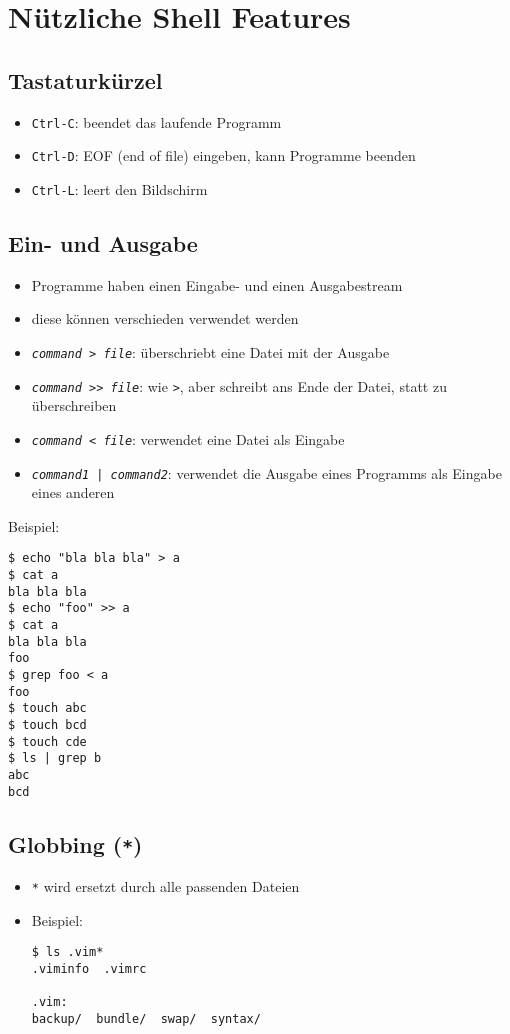 \section{Nützliche Shell Features}
\subsection{Tastaturkürzel}
\begin{itemize}
  \item \texttt{Ctrl-C}: beendet das laufende Programm
  \item \texttt{Ctrl-D}: EOF (end of file) eingeben, kann Programme beenden
  \item \texttt{Ctrl-L}: leert den Bildschirm
\end{itemize}

\subsection{Ein- und Ausgabe}
\begin{itemize}
  \item Programme haben einen Eingabe- und einen Ausgabestream
  \item diese können verschieden verwendet werden
  \item \texttt{\textit{command} > \textit{file}}: überschriebt eine Datei mit der Ausgabe
  \item \texttt{\textit{command} >> \textit{file}}: wie \texttt{>}, aber schreibt ans Ende der Datei, statt zu überschreiben
  \item \texttt{\textit{command} < \textit{file}}: verwendet eine Datei als Eingabe
  \item \texttt{\textit{command1} | \textit{command2}}: verwendet die Ausgabe eines Programms als Eingabe eines anderen
\end{itemize}
Beispiel:
\begin{verbatim}
$ echo "bla bla bla" > a
$ cat a
bla bla bla
$ echo "foo" >> a
$ cat a
bla bla bla
foo
$ grep foo < a
foo
$ touch abc
$ touch bcd
$ touch cde
$ ls | grep b
abc
bcd
\end{verbatim}

\subsection{Globbing (\texttt{*})}
\begin{itemize}
  \item \texttt{*} wird ersetzt durch alle passenden Dateien
  \item Beispiel:
\begin{verbatim}
$ ls .vim*
.viminfo  .vimrc

.vim:
backup/  bundle/  swap/  syntax/
\end{verbatim}
\end{itemize}

